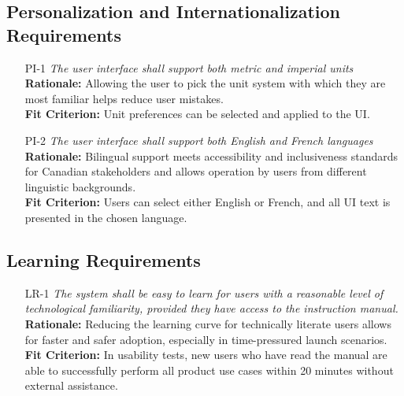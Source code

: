 \documentclass[12pt]{article}
\begin{document}
\subsection{Personalization and Internationalization Requirements}
\begin{itemize}[leftmargin=*]
  \item[PI-1] \emph{The user interface shall support both metric and imperial units}\\[2mm]
        \textbf{Rationale:} Allowing the user to pick the unit system with which they are most familiar helps reduce user mistakes. \\
        \textbf{Fit Criterion:} Unit preferences can be selected and applied to the UI.
  \item[PI-2] \emph{The user interface shall support both English and French
          languages}\\[2mm]
        \textbf{Rationale:} Bilingual support meets accessibility and inclusiveness standards for Canadian stakeholders and allows operation by users from different linguistic backgrounds.\\
        \textbf{Fit Criterion:} Users can select either English or French, and all UI text is presented in the chosen language.
\end{itemize}

\subsection{Learning Requirements}
\begin{itemize}[leftmargin=*]
  \item[LR-1] \emph{The system shall be easy to learn for users with a reasonable level
          of technological familiarity, provided they have access to the instruction
          manual.}\\[2mm]
        \textbf{Rationale:} Reducing the learning curve for technically literate users allows for faster and safer adoption, especially in time-pressured launch scenarios.\\
        \textbf{Fit Criterion:} In usability tests, new users who have read the manual are able to successfully perform all product use cases within 20 minutes without external assistance.

\end{itemize}
\end{document}
